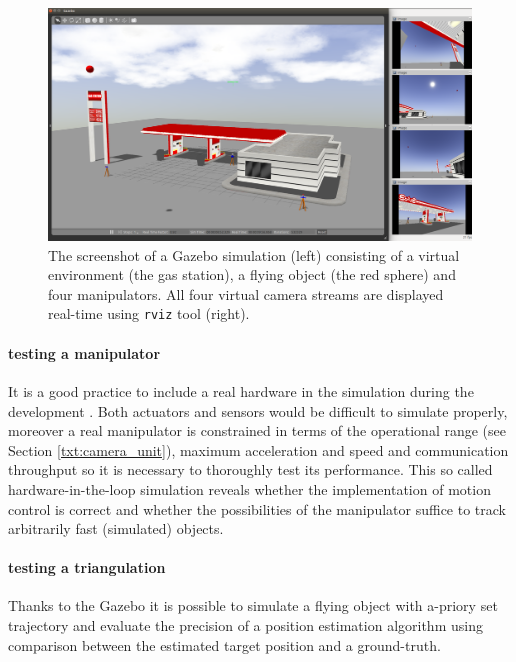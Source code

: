 	\begin{figure}[htb]
		\centering
		\includegraphics[width=14.5cm]{fig/gazebo_camera_stream.png}
		\caption{The screenshot of a Gazebo simulation (left) consisting of a virtual environment (the gas station), a flying object (the red sphere) and four manipulators. All four virtual camera streams are displayed real-time using \texttt{rviz} tool (right).}
		\label{fig:gazebo_camera_stream}
	\end{figure}
	
	\paragraph{testing a manipulator} It is a good practice to include a real hardware in the simulation during the development \cite{on_hw_in_the_loop}. Both actuators and sensors would be difficult to simulate properly, moreover a real manipulator is constrained in terms of the operational range (see Section \ref{txt:camera_unit}), maximum acceleration and speed and communication throughput so it is necessary to thoroughly test its performance. This so called hardware-in-the-loop simulation reveals whether the implementation of motion control is correct and whether the possibilities of the manipulator suffice to track arbitrarily fast (simulated) objects.
	
	\paragraph{testing a triangulation} Thanks to the Gazebo it is possible to simulate a flying object with a-priory set trajectory and evaluate the precision of a position estimation algorithm using comparison between the estimated target position and a ground-truth.
	
